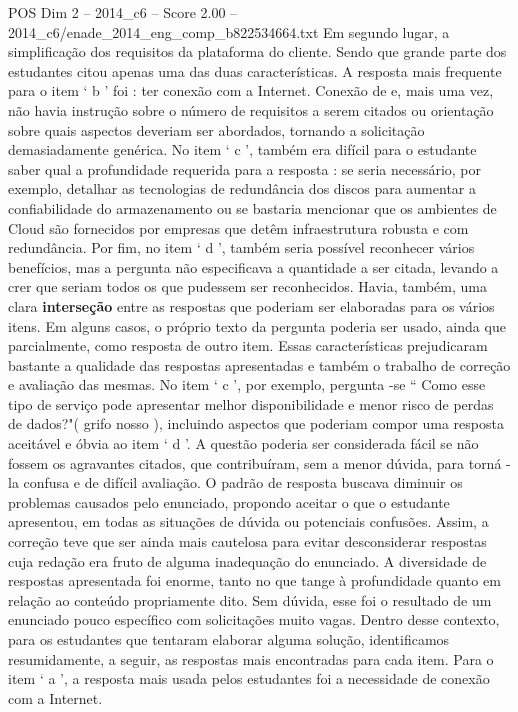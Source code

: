 \begin{textsample}{POS Dim 2 – 2014\_c6 – Score 2.00 – 2014\_c6/enade\_2014\_eng\_comp\_b822534664.txt}
Em segundo lugar, a simplificação dos requisitos da plataforma do cliente.
Sendo que grande parte dos estudantes citou apenas uma das duas características.
A resposta mais frequente para o item ‘ b ’ foi : ter conexão com a Internet.
Conexão de e, mais uma vez, não havia instrução sobre o número de requisitos a serem citados ou orientação sobre quais aspectos deveriam ser abordados, tornando a solicitação demasiadamente genérica.
No item ‘ c ’, também era difícil para o estudante saber qual a profundidade requerida para a resposta : se seria necessário, por exemplo, detalhar as tecnologias de redundância dos discos para aumentar a confiabilidade do armazenamento ou se bastaria mencionar que os ambientes de Cloud são fornecidos por empresas que detêm infraestrutura robusta e com redundância.
Por fim, no item ‘ d ’, também seria possível reconhecer vários benefícios, mas a pergunta não especificava a quantidade a ser citada, levando a crer que seriam todos os que pudessem ser reconhecidos.
Havia, também, uma clara \textbf{interseção} entre as respostas que poderiam ser elaboradas para os vários itens.
Em alguns casos, o próprio texto da pergunta poderia ser usado, ainda que parcialmente, como resposta de outro item.
Essas características prejudicaram bastante a qualidade das respostas apresentadas e também o trabalho de correção e avaliação das mesmas.
No item ‘ c ’, por exemplo, pergunta -se “ Como esse tipo de serviço pode apresentar melhor disponibilidade e menor risco de perdas de dados?"( grifo nosso ), incluindo aspectos que poderiam compor uma resposta aceitável e óbvia ao item ‘ d ’.
A questão poderia ser considerada fácil se não fossem os agravantes citados, que contribuíram, sem a menor dúvida, para torná -la confusa e de difícil avaliação.
O padrão de resposta buscava diminuir os problemas causados pelo enunciado, propondo aceitar o que o estudante apresentou, em todas as situações de dúvida ou potenciais confusões.
Assim, a correção teve que ser ainda mais cautelosa para evitar desconsiderar respostas cuja redação era fruto de alguma inadequação do enunciado.
A diversidade de respostas apresentada foi enorme, tanto no que tange à profundidade quanto em relação ao conteúdo propriamente dito.
Sem dúvida, esse foi o resultado de um enunciado pouco específico com solicitações muito vagas.
Dentro desse contexto, para os estudantes que tentaram elaborar alguma solução, identificamos resumidamente, a seguir, as respostas mais encontradas para cada item.
Para o item ‘ a ’, a resposta mais usada pelos estudantes foi a necessidade de conexão com a Internet.

\end{textsample}
